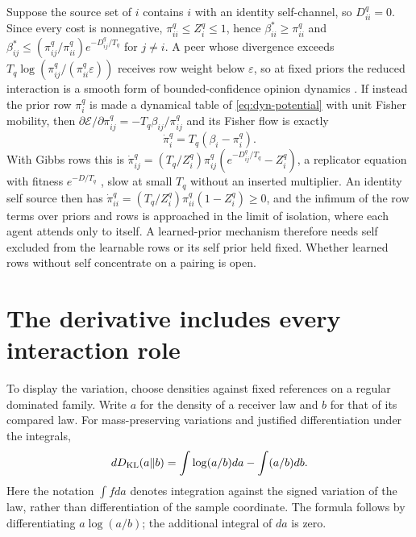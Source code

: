 Suppose the source set of $i$ contains $i$ with an identity self-channel, so $D^q_{ii}=0$. Since every cost is nonnegative, $\pi_{ii}^q\leq Z_i^q\leq1$, hence $\beta_{ii}^*\geq\pi_{ii}^q$ and $\beta_{ij}^*\leq(\pi_{ij}^q/\pi_{ii}^q)e^{-D^q_{ij}/T_q}$ for $j\neq i$. A peer whose divergence exceeds $T_q\log(\pi^q_{ij}/(\pi^q_{ii}\varepsilon))$ receives row weight below $\varepsilon$, so at fixed priors the reduced interaction is a smooth form of bounded-confidence opinion dynamics \citep{HegselmannKrause2002}. If instead the prior row $\pi_i^q$ is made a dynamical table of \cref{eq:dyn-potential} with unit Fisher mobility, then $\partial\mathcal E/\partial\pi^q_{ij}=-T_q\beta_{ij}/\pi^q_{ij}$ and its Fisher flow is exactly
\begin{equation}
 \dot\pi_i^q=T_q(\beta_i-\pi_i^q).
 \label{eq:dyn-prior-learning}
\end{equation}
With Gibbs rows this is $\dot\pi^q_{ij}=(T_q/Z_i^q)\pi^q_{ij}(e^{-D^q_{ij}/T_q}-Z_i^q)$, a replicator equation with fitness $e^{-D/T_q}$ \citep{HofbauerSigmund1998}, slow at small $T_q$ without an inserted multiplier. An identity self source then has $\dot\pi^q_{ii}=(T_q/Z_i^q)\pi^q_{ii}(1-Z_i^q)\geq0$, and the infimum of the row terms over priors and rows is approached in the limit of isolation, where each agent attends only to itself. A learned-prior mechanism therefore needs self excluded from the learnable rows or its self prior held fixed. Whether learned rows without self concentrate on a pairing is open.

\section{The derivative includes every interaction role}
\label{sec:dyn-variation}

To display the variation, choose densities against fixed references on a regular dominated family. Write $a$ for the density of a receiver law and $b$ for that of its compared law. For mass-preserving variations and justified differentiation under the integrals,
\begin{equation}
 dD_{\mathrm{KL}}(a\Vert b)
 =\int\log(a/b)da-\int(a/b)db.
 \label{eq:dyn-kl-differential}
\end{equation}
Here the notation $\int f da$ denotes integration against the signed variation of the law, rather than differentiation of the sample coordinate. The formula follows by differentiating $a\log(a/b)$; the additional integral of $da$ is zero.

